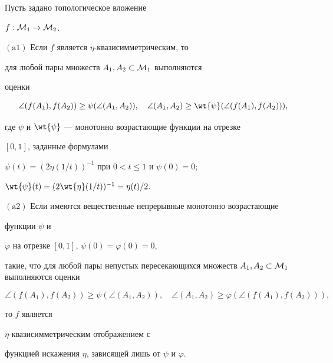 \begin{thms}


Пусть задано топологическое вложение 


$f: {\cal M}_1 \to {\cal M}_2$. 





$(\mathrm a1)$ Если $f$ является $\eta$-{}квазисимметрическим, то 


для любой пары множеств $A_1, A_2 \subset {\cal M}_1$ выполняются 


оценки 


\begin{equation} 


\angle(f(A_1), f(A_2)) \geq \psi(\angle(A_1, A_2)), \quad 


\angle(A_1, A_2) \geq \wt{\psi}(\angle(f(A_1), f(A_2))), 


\end{equation}


где $\psi$ и $\wt{\psi}$ --- монотонно возрастающие функции на отрезке 


$[0,1]$, заданные формулами 


$\psi(t)=(2\eta(1/t))^{-1}$ при $0 < t \leq 1$ и $\psi(0)=0;$ 


$\wt{\psi}(t)=(2\wt{\eta}(1/t))^{-1}=\eta(t)/2$.





$(\mathrm a2)$ Если имеются вещественные непрерывные монотонно возрастающие 


функции $\psi$ и 


$\varphi$ на отрезке $[0,1]$, $\psi(0)=\varphi(0)=0$, 


такие, что для любой пары непустых пересекающихся множеств $A_1, A_2 \subset 


{\cal M}_1$ выполняются оценки


\begin{equation} 


\angle(f(A_1), f(A_2)) \geq \psi(\angle(A_1, A_2)), \quad


\angle(A_1, A_2) \geq \varphi(\angle(f(A_1), f(A_2))), 


\end{equation}


то $f$ является


$\eta$-{}квазисимметрическим отображением с


функцией искажения $\eta$, зависящей лишь от $\psi$ и $\varphi$.






\end{thms}
